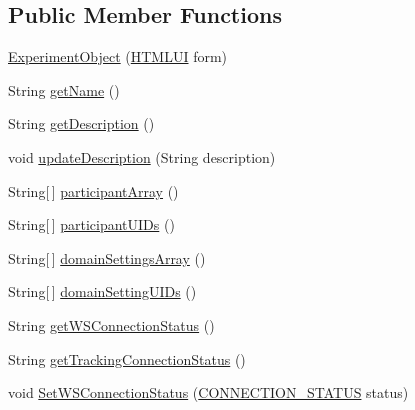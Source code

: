 \subsection*{Public Member Functions}
\begin{DoxyCompactItemize}
\item 
\hyperlink{class_web_analyzer_1_1_u_i_1_1_interaction_objects_1_1_experiment_object_aa99f1fedb72d6876d8d4020e89ca4315}{Experiment\+Object} (\hyperlink{class_web_analyzer_1_1_u_i_1_1_h_t_m_l_u_i}{H\+T\+M\+L\+U\+I} form)
\item 
String \hyperlink{class_web_analyzer_1_1_u_i_1_1_interaction_objects_1_1_experiment_object_a5e02c96733933f6e14d50f48fcaf4edc}{get\+Name} ()
\item 
String \hyperlink{class_web_analyzer_1_1_u_i_1_1_interaction_objects_1_1_experiment_object_af25a51caebf59867b0eeeb2680dfd1fd}{get\+Description} ()
\item 
void \hyperlink{class_web_analyzer_1_1_u_i_1_1_interaction_objects_1_1_experiment_object_ac8daa908afe1e91d835d6df6c4d53caa}{update\+Description} (String description)
\item 
String\mbox{[}$\,$\mbox{]} \hyperlink{class_web_analyzer_1_1_u_i_1_1_interaction_objects_1_1_experiment_object_a1a43f8d6cc9b6b773681f766d8273023}{participant\+Array} ()
\item 
String\mbox{[}$\,$\mbox{]} \hyperlink{class_web_analyzer_1_1_u_i_1_1_interaction_objects_1_1_experiment_object_a5f4674c9f3a4ef9214bd6722f356ff14}{participant\+U\+I\+Ds} ()
\item 
String\mbox{[}$\,$\mbox{]} \hyperlink{class_web_analyzer_1_1_u_i_1_1_interaction_objects_1_1_experiment_object_a150c4672bd1ed68b1db01cf2391107ec}{domain\+Settings\+Array} ()
\item 
String\mbox{[}$\,$\mbox{]} \hyperlink{class_web_analyzer_1_1_u_i_1_1_interaction_objects_1_1_experiment_object_ad35fa2e95cd9c5b7f51a033bebe87beb}{domain\+Setting\+U\+I\+Ds} ()
\item 
String \hyperlink{class_web_analyzer_1_1_u_i_1_1_interaction_objects_1_1_experiment_object_a752a6ca906248d36a0e4251a2bf16959}{get\+W\+S\+Connection\+Status} ()
\item 
String \hyperlink{class_web_analyzer_1_1_u_i_1_1_interaction_objects_1_1_experiment_object_a2116c6efb6ed86405de36aaa6947045b}{get\+Tracking\+Connection\+Status} ()
\item 
void \hyperlink{class_web_analyzer_1_1_u_i_1_1_interaction_objects_1_1_experiment_object_ad7c2424ce1f5611ec7fe303d362b959d}{Set\+W\+S\+Connection\+Status} (\hyperlink{class_web_analyzer_1_1_u_i_1_1_interaction_objects_1_1_experiment_object_a2875208b4f4b0ed643593152f4ec025c}{C\+O\+N\+N\+E\+C\+T\+I\+O\+N\+\_\+\+S\+T\+A\+T\+U\+S} status)

\end{DoxyCompactItemize}
